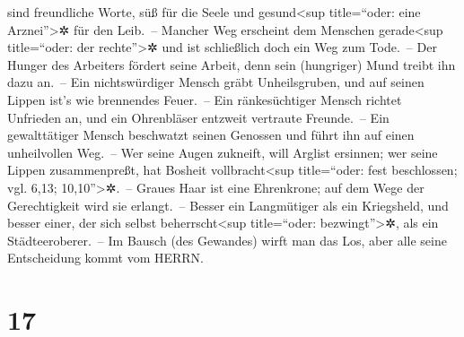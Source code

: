 sind freundliche Worte, süß für die Seele und gesund\textless sup
title=``oder: eine Arznei''\textgreater✲ für den Leib.~--
Mancher Weg erscheint dem Menschen gerade\textless sup
title=``oder: der rechte''\textgreater✲ und ist schließlich doch ein Weg
zum Tode.~-- Der Hunger des Arbeiters fördert seine
Arbeit, denn sein (hungriger) Mund treibt ihn dazu an.~--
Ein nichtswürdiger Mensch gräbt Unheilsgruben, und auf
seinen Lippen ist's wie brennendes Feuer.~-- Ein
ränkesüchtiger Mensch richtet Unfrieden an, und ein Ohrenbläser entzweit
vertraute Freunde.~-- Ein gewalttätiger Mensch beschwatzt
seinen Genossen und führt ihn auf einen unheilvollen Weg.~--
Wer seine Augen zukneift, will Arglist ersinnen; wer
seine Lippen zusammenpreßt, hat Bosheit vollbracht\textless sup
title=``oder: fest beschlossen; vgl. 6,13; 10,10''\textgreater✲.~--
Graues Haar ist eine Ehrenkrone; auf dem Wege der
Gerechtigkeit wird sie erlangt.~-- Besser ein Langmütiger
als ein Kriegsheld, und besser einer, der sich selbst
beherrscht\textless sup title=``oder: bezwingt''\textgreater✲, als ein
Städteeroberer.~-- Im Bausch (des Gewandes) wirft man das
Los, aber alle seine Entscheidung kommt vom HERRN.

\hypertarget{section-16}{%
\section{17}\label{section-16}}

